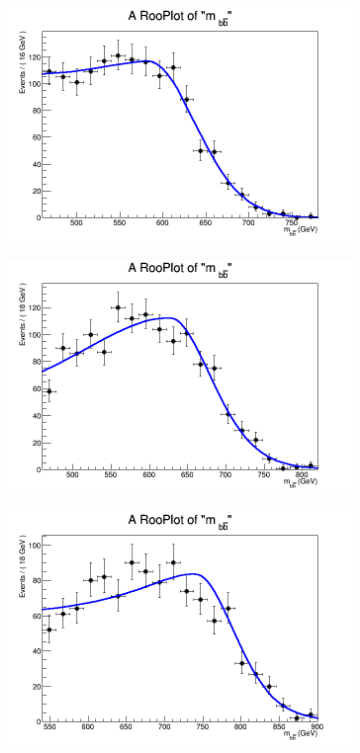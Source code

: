 \begin{figure}[phtb!]
\begin{center}
  \begin{subfigure}[$m_{A}=650$ GeV]{0.4\textwidth}\includegraphics[width=\textwidth]{FitResults/images/fitMC_bAbb650_5.png}\end{subfigure}
  \begin{subfigure}[$m_{A}=700$ GeV]{0.4\textwidth}\includegraphics[width=\textwidth]{FitResults/images/fitMC_bAbb700_5.png}\end{subfigure}
  \begin{subfigure}[$m_{A}=800$ GeV]{0.4\textwidth}\includegraphics[width=\textwidth]{FitResults/images/fitMC_bAbb800_5.png}\end{subfigure}

\end{center}
\end{figure}

